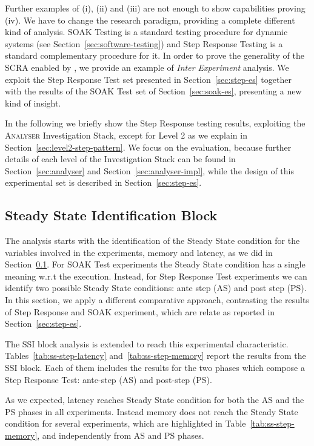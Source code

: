 Further examples of (i), (ii) and (iii) are not enough to show \name capabilities proving (iv). We have to change the research paradigm, providing a complete different kind of analysis. SOAK Testing is a standard testing procedure for dynamic systems (see Section~\ref{sec:software-testing}) and Step Response Testing is a standard complementary procedure for it. In order to prove the generality of the SCRA enabled by \namens, we provide an example of \textit{Inter Experiment} analysis. We exploit the Step Response Test set presented in Section~\ref{sec:step-es} together with the results of the SOAK Test set of Section~\ref{sec:soak-es}, presenting a new kind of insight.

In the following we briefly show the Step Response testing results, exploiting the \textsc{Analyser} Investigation Stack, except for Level 2 as we explain in Section~\ref{sec:level2-step-pattern}. We focus on the evaluation, because further details of each level of the Investigation Stack can be found in Section~\ref{sec:analyser} and Section~\ref{sec:analyser-impl}, while the design of this experimental set is described in Section~\ref{sec:step-es}.

\subsection{Steady State Identification Block}\label{sec:level0-step-ssib}

The analysis starts with the identification of the Steady State condition for the variables involved in the experiments, memory and latency, as we did in Section~\ref{sec:level0-step-ssib}. For SOAK Test experiments the Steady State condition has a single meaning w.r.t the execution. Instead, for Step Response Test experiments we can identify two possible Steady State conditions: ante step (AS) and post step (PS). In this section, we apply a different comparative approach, contrasting the results of Step Response and SOAK experiment, which are relate as reported in Section~\ref{sec:step-es}. 

The SSI block analysis is extended to reach this experimental characteristic. Tables~\ref{tab:ss-step-latency} and~\ref{tab:ss-step-memory} report the results from the SSI block. Each of them includes the results for the two phases which compose a Step Response Test: ante-step (AS) and post-step (PS). 

As we expected, latency reaches Steady State condition for both the AS and the PS phases in all experiments. Instead memory does not reach the Steady State condition for several experiments,  which are highlighted in Table~\ref{tab:ss-step-memory}, and independently from AS and PS phases.

